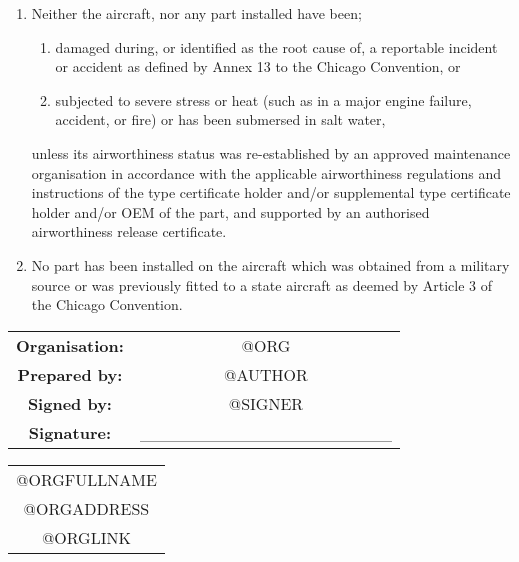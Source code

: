 \documentclass{article}
\begin{document}
 \begin{enumerate}
     \item Neither the aircraft, nor any part installed have been;
     \begin{enumerate}
         \item damaged during, or identified as the root cause of, a reportable incident or accident as defined by Annex 13 to the Chicago Convention, or
         \item subjected to severe stress or heat (such as in a major engine failure, accident, or fire) or has been submersed in salt water,
     \end{enumerate}
     unless its airworthiness status was re-established by an approved maintenance organisation in accordance with the applicable airworthiness regulations and instructions of the type certificate holder and/or supplemental type certificate holder and/or OEM of the part, and supported by an authorised airworthiness release certificate.

     \item No part has been installed on the aircraft which was obtained from a military source or was previously fitted to a state aircraft as deemed by Article 3 of the Chicago Convention.
 \end{enumerate}

\vspace{20pt}

 \begin{tabular}{c c}

      \textbf{Organisation:} & @ORG\\
      \textbf{Prepared by: } & @AUTHOR \\
      \textbf{Signed by: } & @SIGNER \\
      \textbf{Signature: } & \_\_\_\_\_\_\_\_\_\_\_\_\_\_\_\_\_\_\_\_\_ \\
 \end{tabular}

\vspace{20pt}

\begin{tabular}{c}
     @ORGFULLNAME \\
     @ORGADDRESS \\
     @ORGLINK
\end{tabular}
\end{document}
